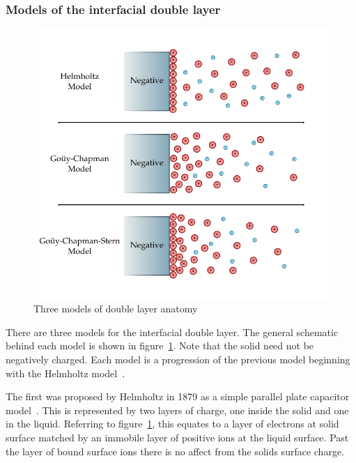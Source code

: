   \subsubsection*{Models of the interfacial double layer}
    \begin{figure}
      \begin{center}
        \includegraphics{content/introduction/graphics/doubleLayerModels}
      \end{center}
      \caption{Three models of double layer anatomy}
      \label{fig:doubleLayerModels}
    \end{figure}
  
    There are three models for the interfacial double layer.
    The general schematic behind each model is shown in figure~\ref{fig:doubleLayerModels}.
    Note that the solid need not be negatively charged.
    Each model is a progression of the previous model beginning with the Helmholtz model~\cite{Horch2004}.

    The first was proposed by Helmholtz in 1879 as a simple parallel plate capacitor model~\cite{Geddes1997}.
    This is represented by two layers of charge, one inside the solid and one in the liquid.
    Referring to figure~\ref{fig:doubleLayerModels}, this equates to a layer of electrons at solid surface matched by an immobile layer of positive ions at the liquid surface.
    Past the layer of bound surface ions there is no affect from the solids surface charge.

